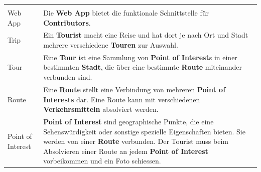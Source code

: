 \documentclass[ngerman,]{article}
\begin{document}
\begin{longtable}[]{@{}ll@{}}
\begin{minipage}[t]{0.86\columnwidth}
\end{minipage}\tabularnewline
\begin{minipage}[t]{0.08\columnwidth}\raggedright\strut
Web App\strut
\end{minipage} & \begin{minipage}[t]{0.86\columnwidth}\raggedright\strut
Die \textbf{Web App} bietet die funktionale Schnittstelle für
\textbf{Contributors}.\strut
\end{minipage}\tabularnewline
\begin{minipage}[t]{0.08\columnwidth}\raggedright\strut
Trip\strut
\end{minipage} & \begin{minipage}[t]{0.86\columnwidth}\raggedright\strut
Ein \textbf{Tourist} macht eine Reise und hat dort je nach Ort und Stadt
mehrere verschiedene \textbf{Touren} zur Auswahl.\strut
\end{minipage}\tabularnewline
\begin{minipage}[t]{0.08\columnwidth}\raggedright\strut
Tour\strut
\end{minipage} & \begin{minipage}[t]{0.86\columnwidth}\raggedright\strut
Eine \textbf{Tour} ist eine Sammlung von \textbf{Point of Interest}s in
einer bestimmten \textbf{Stadt}, die über eine bestimmte \textbf{Route}
miteinander verbunden sind.\strut
\end{minipage}\tabularnewline
\begin{minipage}[t]{0.08\columnwidth}\raggedright\strut
Route\strut
\end{minipage} & \begin{minipage}[t]{0.86\columnwidth}\raggedright\strut
Eine \textbf{Route} stellt eine Verbindung von mehreren \textbf{Point of
Interests} dar. Eine Route kann mit verschiedenen
\textbf{Verkehrsmitteln} absolviert werden.\strut
\end{minipage}\tabularnewline
\begin{minipage}[t]{0.08\columnwidth}\raggedright\strut
Point of Interest\strut
\end{minipage} & \begin{minipage}[t]{0.86\columnwidth}\raggedright\strut
\textbf{Point of Interest} sind geographische Punkte, die eine
Sehenswürdigkeit oder sonstige spezielle Eigenschaften bieten. Sie
werden von einer \textbf{Route} verbunden. Der Tourist muss beim
Absolvieren einer Route an jedem \textbf{Point of Interest} vorbeikommen
und ein Foto schiessen.\strut
\end{minipage}\tabularnewline

\end{longtable}
\end{document}
